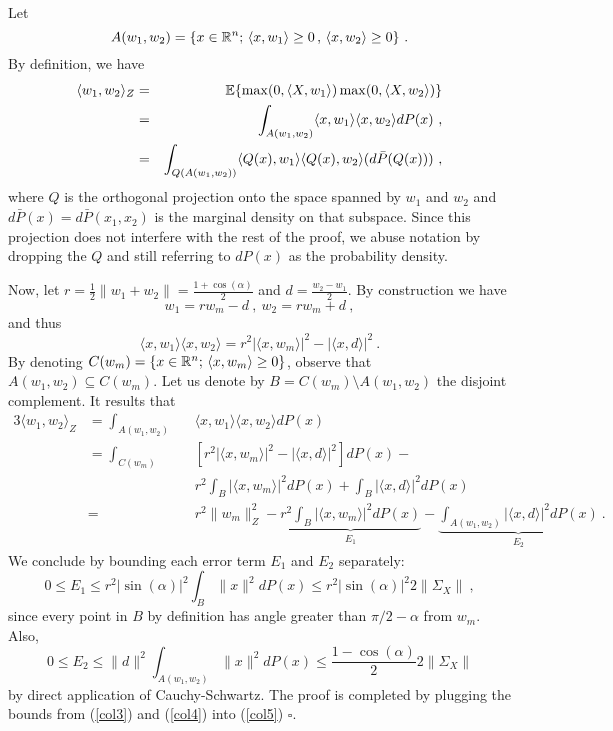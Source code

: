 Let 
$$A(w_1, w_2) = \{ x \in {\mathbb{R}}^n; \, \langle x, w_1 \rangle \geq 0\,,\, \langle x, w_2 \rangle \geq 0\}~.$$
By definition, we have 
\begin{eqnarray}
\label{col1}
\langle w_1, w_2 \rangle_Z &=& {\mathbb{E}} \{ \max(0, \langle X, w_1 \rangle ) \max(0, \langle X, w_2 \rangle ) \} \\
&=& \int_{A(w_1, w_2)} \langle x, w_1 \rangle  \langle x, w_2 \rangle dP(x)~, \\
&=& \int_{Q({A}(w_1, w_2))}  \langle Q(x), w_1 \rangle  \langle Q(x), w_2 \rangle (d\bar{P}(Q(x)))~,  
\end{eqnarray}
where $Q$ is the orthogonal projection onto the space spanned by $w_1$ and $w_2$ and
 $d\bar{P}(x)=d\bar{P}(x_1, x_2)$ is the marginal density on that subspace. 
 Since this projection does not interfere with the rest of the proof, we abuse notation by dropping the $Q$ and still referring to $dP(x)$ as the probability density.

Now, let $r = \frac{1}{2}\| w_1 + w_2 \| = \frac{1 + \cos(\alpha)}{2}$ and $d = \frac{w_2 - w_1}{2}$.
By construction we have 
$$w_1 = r w_m - d~,~ w_2 = r w_m + d~,$$
and thus 
\begin{equation}
\label{col2}
\langle x, w_1 \rangle  \langle x, w_2 \rangle = r^2 | \langle x, w_m \rangle |^2 - | \langle x, d \rangle |^2~.
\end{equation}
By denoting $C(w_m) = \{ x \in {\mathbb{R}}^n;\, \langle x, w_m \rangle \geq 0 \}$, 
observe that $A(w_1, w_2 ) \subseteq C(w_m)$. Let us denote by $B = C(w_m) \setminus A(w_1, w_2) $ the disjoint complement. It results that 
\begin{alignat}{3}
\langle w_1, w_2 \rangle_Z &= \int_{A(w_1, w_2)} &&\langle x, w_1 \rangle  \langle x, w_2 \rangle dP(x) \nonumber \\
&= \int_{C(w_m)} &&[r^2 | \langle x, w_m \rangle |^2 - | \langle x, d \rangle |^2 ] dP(x) - \nonumber \\
& &&r^2 \int_B  | \langle x, w_m \rangle |^2 dP(x) + \int_B  | \langle x, d \rangle |^2  dP(x) \nonumber \\ 
&= &&r^2 \| w_m \|_Z^2 - \underbrace{ r^2 \int_B  | \langle x, w_m \rangle |^2 dP(x)}_{E_1} - \underbrace{\int_{A(w_1, w_2)} | \langle x, d \rangle |^2  dP(x) }_{E_2}~.
\end{alignat} 
We conclude by bounding each error term $E_1$ and $E_2$ separately:
\begin{equation}
\label{col3}
0 \leq E_1 \leq r^2 |\sin(\alpha)|^2 \int_B \| x \|^2 dP(x) \leq r^2 |\sin(\alpha)|^2 2 \| \Sigma_X\|~,
\end{equation}
since every point in $B$ by definition has angle greater than $\pi/2 - \alpha$ from $w_m$. Also,
\begin{equation}
\label{col4}
0 \leq E_2 \leq \|d \|^2 \int_{A(w_1, w_2)} \| x \|^2 dP(x) \leq \frac{1 - \cos(\alpha)}{2} 2 \| \Sigma_X \|
\end{equation}
by direct application of Cauchy-Schwartz. The proof is completed by plugging the bounds from (\ref{col3}) and (\ref{col4}) into (\ref{col5})  $\square$.


